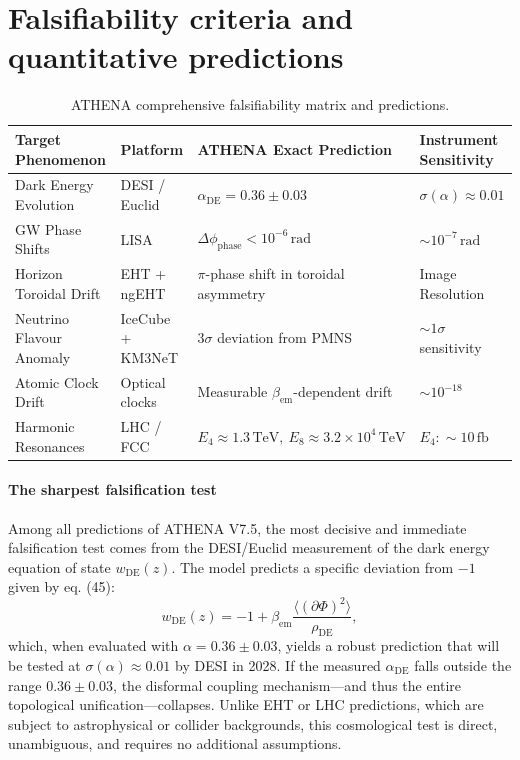 \documentclass[11pt,a4paper]{article}
\begin{document}
\section{Falsifiability criteria and quantitative predictions}
\label{sec:falsifiability}
\begin{table}[h]
\centering
\caption{ATHENA comprehensive falsifiability matrix and predictions.}
\label{tab:falsifiability}
\begin{tabular}{l l l l}
\toprule
Target Phenomenon & Platform & ATHENA Exact Prediction & Instrument Sensitivity \\
\midrule
Dark Energy Evolution & DESI / Euclid & \(\alpha_{\mathrm{DE}} = 0.36 \pm 0.03\) & \(\sigma(\alpha) \approx 0.01\) \\
GW Phase Shifts & LISA & \(\Delta \phi_{\mathrm{phase}} < 10^{-6}\,\mathrm{rad}\) & \(\sim 10^{-7}\,\mathrm{rad}\) \\
Horizon Toroidal Drift & EHT + ngEHT & \(\pi\)-phase shift in toroidal asymmetry & Image Resolution \\
Neutrino Flavour Anomaly & IceCube + KM3NeT & \(3\sigma\) deviation from PMNS & \(\sim 1\sigma\) sensitivity \\
Atomic Clock Drift & Optical clocks & Measurable \(\beta_{\mathrm{em}}\)-dependent drift & \(\sim 10^{-18}\) \\
Harmonic Resonances & LHC / FCC & \(E_4 \approx 1.3\,\mathrm{TeV},\ E_8 \approx 3.2\times10^4\,\mathrm{TeV}\) & \(E_4: \sim 10\,\mathrm{fb}\) \\
\bottomrule
\end{tabular}
\end{table}

\paragraph{The sharpest falsification test}
Among all predictions of ATHENA V7.5, the most decisive and immediate falsification test comes from the DESI/Euclid measurement of the dark energy equation of state \( w_{\mathrm{DE}}(z) \). The model predicts a specific deviation from \( -1 \) given by eq. (45):
\[
w_{\mathrm{DE}}(z) = -1 + \beta_{\mathrm{em}} \frac{\langle(\partial \Phi)^2\rangle}{\rho_{\mathrm{DE}}},
\]
which, when evaluated with \( \alpha = 0.36 \pm 0.03 \), yields a robust prediction that will be tested at \( \sigma(\alpha) \approx 0.01 \) by DESI in 2028. If the measured \( \alpha_{\mathrm{DE}} \) falls outside the range \( 0.36 \pm 0.03 \), the disformal coupling mechanism—and thus the entire topological unification—collapses. Unlike EHT or LHC predictions, which are subject to astrophysical or collider backgrounds, this cosmological test is direct, unambiguous, and requires no additional assumptions.
\end{document}
